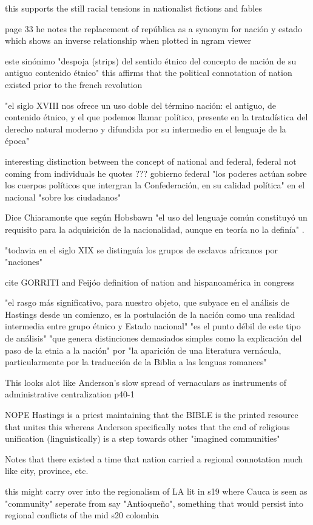 \documentclass[12pt]{article}
\begin{document}
this supports the still racial tensions in nationalist fictions and fables

page 33 he notes the replacement of república as a synonym for nación y estado which shows an inverse relationship when plotted in ngram viewer

este sinónimo "despoja (strips) del sentido étnico del concepto de nación de su antiguo contenido étnico" \cite[33]{Chiaramonte2004}
this affirms that the political connotation of nation existed prior to the french revolution

"el siglo XVIII nos ofrece un uso doble del término nación: el antiguo, de contenido étnico, y el que podemos llamar político, presente en la tratadística del derecho natural moderno y difundida por su intermedio en el lenguaje de la época" \cite[37]{Chiaramonte2004}

interesting distinction between the concept of national and federal, federal not coming from individuals
he quotes ??? gobierno federal "los poderes actúan sobre los cuerpos políticos que intergran la Confederación, en su calidad política"
 en el nacional "sobre los ciudadanos"
 
Dice Chiaramonte que según Hobsbawn "el uso del lenguaje común constituyó un requisito para la adquisición de la nacionalidad, aunque en teoría no la definía" \cite[39]{Chiaramonte2004}.

"todavia en el siglo XIX se distinguía los grupos de esclavos africanos por "naciones" \cite[40]{Chiaramonte2004}

cite GORRITI and Feijóo definition of nation and hispanoamérica in congress \cite[41]{Chiaramonte2004}
 
"el rasgo más significativo, para nuestro objeto, que subyace en el análisis de Hastings desde un comienzo, es la postulación de la nación como una realidad intermedia entre grupo étnico y Estado nacional" \cite[45]{Chiaramonte2004}
"es el punto débil de este tipo de análisis" "que genera distinciones demasiados simples como la explicación del paso de la etnia a la nación" por "la aparición de una literatura vernácula, particularmente por la traducción de la Biblia a las lenguas romances" \cite[45]{Chiaramonte2004}

This looks alot like Anderson's slow spread of vernaculars as instruments of administrative centralization p40-1

NOPE Hastings is a priest maintaining that the BIBLE is the printed resource that unites this whereas Anderson specifically notes that the end of religious unification (linguistically) is a step towards other "imagined communities"

Notes that there existed a time that nation carried a regional connotation much like city, province, etc.

this might carry over into the regionalism of LA lit in s19 where Cauca is seen as "community" seperate from say "Antioqueño", something that would persist into regional conflicts of the mid s20 colombia

\makeworkscited
\end{document}
